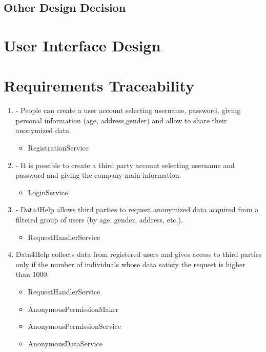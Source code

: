 \documentclass[a4paper]{article}
\begin{document}
\subsection{Other Design Decision}

\section{User Interface Design}

\section{Requirements Traceability}

\begin{enumerate}[label*=\bf{R.\arabic*}]

\item - People can create a user account selecting username, password,
giving personal information (age, address,gender) and allow to
share their anonymized data.

\begin{itemize}
\item RegistrationService
\end{itemize}

\item - It is possible to create a third party account selecting username
and password and giving the company main information.

\begin{itemize}
\item LoginService
\end{itemize}

\item - Data4Help allows third parties to request anonymized data acquired
from a filtered group of users (by age, gender, address, etc.).

\begin{itemize}
\item RequestHandlerService
\end{itemize}

\item Data4Help collects data from registered users and gives access to
third parties only if the number of individuals whose data satisfy the
request is higher than 1000.

\begin{itemize}
\item RequestHandlerService
\item AnonymousPermissionMaker
\item AnonymousPermissionService
\item AnonymousDataService
\end{itemize}


\end{enumerate}
\end{document}
